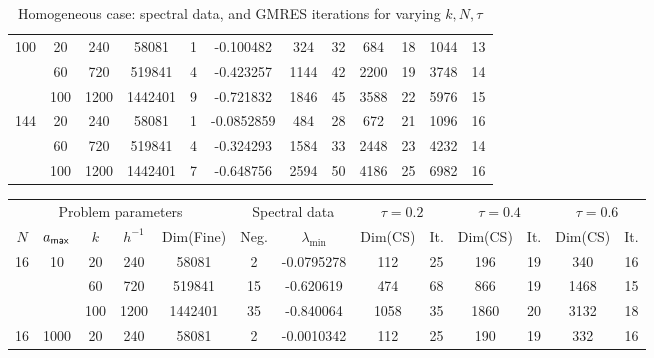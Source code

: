 \documentclass[numbers,webpdf,imaiai]{ima-authoring-template}%
\theoremstyle{thmstyletwo}%
\numberwithin{equation}{section}
\numberwithin{equation}{section}
\newcommand{\amax}{a_{\textup{\textsf{max}}}}
\begin{document}
{\begin{table}[h]
\begin{tabular}{cccc|cc|cc|cc|cc}
100 & 20 & 240 & 58081
& 1 & -0.100482
& 324 & 32
& 684 & 18
& 1044 & 13 \\

 & 60 & 720 & 519841
& 4 & -0.423257
& 1144 & 42
& 2200 & 19
& 3748 & 14 \\

 & 100 & 1200 & 1442401
& 9 & -0.721832
& 1846 & 45
& 3588 & 22
& 5976 & 15 \\

\hline

144 & 20 & 240 & 58081
& 1 & -0.0852859
& 484 & 28
& 672 & 21
& 1096 & 16 \\

 & 60 & 720 & 519841
& 4 & -0.324293
& 1584 & 33
& 2448 & 23
& 4232 & 14 \\

 & 100 & 1200 & 1442401
& 7 & -0.648756
& 2594 & 50
& 4186 & 25
& 6982 & 16 \\

\hline
\end{tabular}
\caption{Homogeneous case: spectral data, and GMRES iterations for varying $k,N,\tau$}
\label{tab:merged_tau}
\end{table}

\begin{table}[h]
\centering
\scriptsize
\hspace*{-0.9cm}
\setlength{\tabcolsep}{3pt}
\begin{tabular}{ccccc|cc|cc|cc|cc}
\multicolumn{5}{c|}{Problem parameters} 
& \multicolumn{2}{c|}{Spectral data}
& \multicolumn{2}{c|}{$\tau=0.2$}
& \multicolumn{2}{c|}{$\tau=0.4$}
& \multicolumn{2}{c}{$\tau=0.6$} \\

$N$ & $\amax$ & $k$ & $h^{-1}$ & Dim(Fine)
& Neg. & $\lambda_{\min}$
& Dim(CS) & It.
& Dim(CS) & It.
& Dim(CS) & It. \\
\hline

16 & 10 & 20 & 240 & 58081
& 2 & -0.0795278
& 112 & 25
& 196 & 19
& 340 & 16 \\

 &  & 60 & 720 & 519841
& 15 & -0.620619
& 474 & 68
& 866 & 19
& 1468 & 15 \\

 &  & 100 & 1200 & 1442401
& 35 & -0.840064
& 1058 & 35
& 1860 & 20
& 3132 & 18 \\
\hline

16 & 1000 & 20 & 240 & 58081
& 2 & -0.0010342
& 112 & 25
& 190 & 19
& 332 & 16 \\


\end{tabular}
\end{table}}
\end{document}
